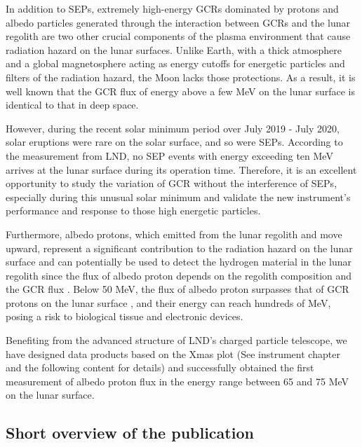 
In addition to \acp{SEP}, extremely high-energy \acp{GCR} dominated by protons and albedo particles generated through the interaction between \acp{GCR} and the lunar regolith are two other crucial components of the plasma environment that cause radiation hazard on the lunar surfaces.
Unlike Earth, with a thick atmosphere and a global magnetosphere acting as energy cutoffs for energetic particles and filters of the radiation hazard, the Moon lacks those protections. As a result, it is well known that the \ac{GCR} flux of energy above a few MeV on the lunar surface is identical to that in deep space.

However, during the recent solar minimum period over July 2019 - July 2020, solar eruptions were rare on the solar surface, and so were \acp{SEP}. According to the measurement from \ac{LND}, no \ac{SEP} events with energy exceeding ten MeV arrives at the lunar surface during its operation time.
Therefore, it is an excellent opportunity to study the variation of \acs{GCR} without the interference of \acp{SEP}, especially during this unusual solar minimum \citep{Strauss2023ApJ, Fu2021ApJS} and validate the new instrument's performance and response to those high energetic particles.    

Furthermore, albedo protons, which emitted from the lunar regolith and move upward, represent a significant contribution to the radiation hazard on the lunar surface and can potentially be used to detect the hydrogen material in the lunar regolith since the flux of albedo proton depends on the regolith composition and the \ac{GCR} flux \citep{Schwadron2016Icarus}.
Below 50 MeV, the flux of albedo proton surpasses that of \ac{GCR} protons on the lunar surface \citep{Dobynde2021JGRE, Wimmer2020SSRv}, and their energy can reach hundreds of MeV, posing a risk to biological tissue and electronic devices.

Benefiting from the advanced structure of \ac{LND}'s charged particle telescope, we have designed data products based on the Xmas plot (See instrument chapter and the following content for details) and successfully obtained the first measurement of albedo proton flux in the energy range between 65 and 75 MeV on the lunar surface.


\subsection*{Short overview of the publication}


